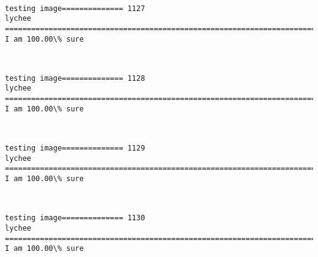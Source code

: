 \documentclass[11pt]{article}
\begin{document}
    \begin{center}
    \end{center}
    { \hspace*{\fill} \\}
    
    \begin{Verbatim}[commandchars=\\\{\}]
testing image============== 1127
lychee
============================================================================
I am 100.00\% sure

    \end{Verbatim}

    \begin{center}
    \end{center}
    { \hspace*{\fill} \\}
    
    \begin{Verbatim}[commandchars=\\\{\}]
testing image============== 1128
lychee
============================================================================
I am 100.00\% sure

    \end{Verbatim}

    \begin{center}
    \end{center}
    { \hspace*{\fill} \\}
    
    \begin{Verbatim}[commandchars=\\\{\}]
testing image============== 1129
lychee
============================================================================
I am 100.00\% sure

    \end{Verbatim}

    \begin{center}
    \end{center}
    { \hspace*{\fill} \\}
    
    \begin{Verbatim}[commandchars=\\\{\}]
testing image============== 1130
lychee
============================================================================
I am 100.00\% sure

    \end{Verbatim}
\end{document}
